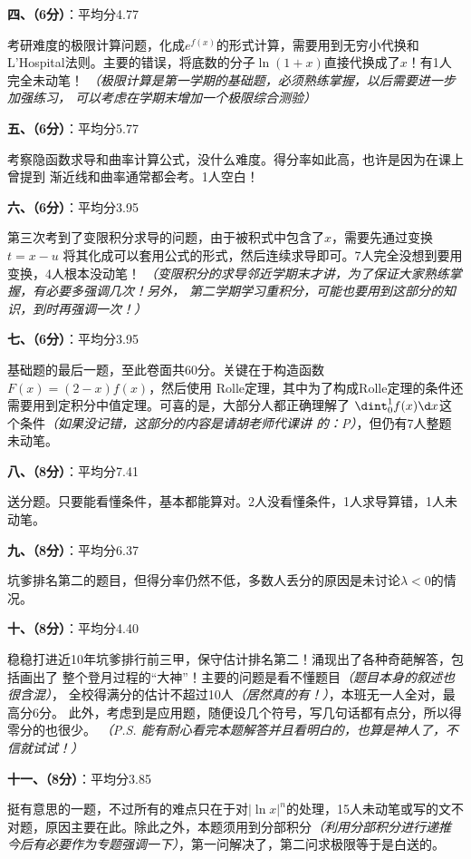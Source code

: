 {\bf 四、（6分）}：平均分4.77

考研难度的极限计算问题，化成$e^{f(x)}$的形式计算，需要用到无穷小代换和
L'Hospital法则。主要的错误，将底数的分子$\ln(1+x)$直接代换成了$x$！有1人完全未动笔！
{\it （极限计算是第一学期的基础题，必须熟练掌握，以后需要进一步加强练习，
可以考虑在学期末增加一个极限综合测验）}

{\bf 五、（6分）}：平均分5.77

考察隐函数求导和曲率计算公式，没什么难度。得分率如此高，也许是因为在课上曾提到
渐近线和曲率通常都会考。1人空白！

{\bf 六、（6分）}：平均分3.95

第三次考到了变限积分求导的问题，由于被积式中包含了$x$，需要先通过变换$t=x-u$
将其化成可以套用公式的形式，然后连续求导即可。7人完全没想到要用变换，4人根本没动笔！
{\it （变限积分的求导邻近学期末才讲，为了保证大家熟练掌握，有必要多强调几次！另外，
第二学期学习重积分，可能也要用到这部分的知识，到时再强调一次！）}

{\bf 七、（6分）}：平均分3.95

基础题的最后一题，至此卷面共60分。关键在于构造函数$F(x)=(2-x)f(x)$，然后使用
Rolle定理，其中为了构成Rolle定理的条件还需要用到定积分中值定理。可喜的是，大部分人都正确理解了
$\dint_0^1f(x)\d x$这个条件{\it （如果没记错，这部分的内容是请胡老师代课讲
的：P）}，但仍有7人整题未动笔。

{\bf 八、（8分）}：平均分7.41

送分题。只要能看懂条件，基本都能算对。2人没看懂条件，1人求导算错，1人未动笔。

{\bf 九、（8分）}：平均分6.37

坑爹排名第二的题目，但得分率仍然不低，多数人丢分的原因是未讨论$\lambda<0$的情况。

{\bf 十、（8分）}：平均分4.40

稳稳打进近10年坑爹排行前三甲，保守估计排名第二！涌现出了各种奇葩解答，包括画出了
整个登月过程的“大神”！主要的问题是看不懂题目{\it （题目本身的叙述也很含混）}，
全校得满分的估计不超过10人{\it （居然真的有！）}，本班无一人全对，最高分6分。
此外，考虑到是应用题，随便设几个符号，写几句话都有点分，所以得零分的也很少。
{\it （P.S. 能有耐心看完本题解答并且看明白的，也算是神人了，不信就试试！）}

{\bf 十一、（8分）}：平均分3.85

挺有意思的一题，不过所有的难点只在于对$|\ln x|^n$的处理，15人未动笔或写的文不
对题，原因主要在此。除此之外，本题须用到分部积分{\it （利用分部积分进行递推
今后有必要作为专题强调一下）}，第一问解决了，第二问求极限等于是白送的。

